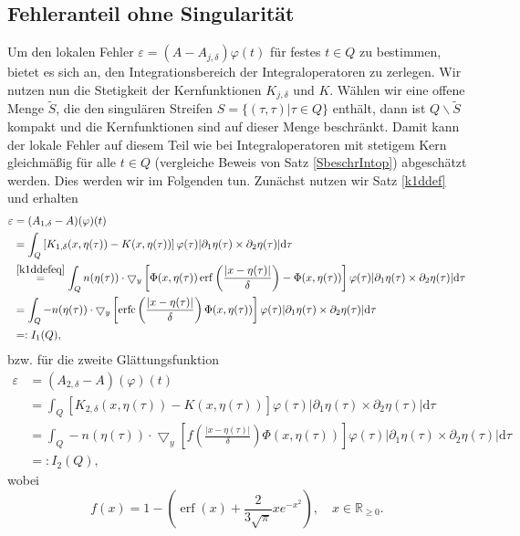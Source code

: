 \documentclass[12pt,a4paper]{scrartcl}
\newcommand{\dd}{\mathrm{d}}
\numberwithin{equation}{section}
\newcommand{\R}{\mathbb{R}} %
\newcommand{\grad}{\bigtriangledown}
\newcommand{\erf}{\operatorname{erf}}
\newcommand{\erfc}{\operatorname{erfc}}
\begin{document}
\subsection{Fehleranteil ohne Singularität} \label{chaepsohnesing}
Um den lokalen Fehler $\varepsilon = (A-A_{j,\delta}) \varphi(t)$ für festes $t \in Q$ zu bestimmen, bietet es sich an, den Integrationsbereich der Integraloperatoren zu zerlegen. Wir nutzen nun die Stetigkeit der Kernfunktionen
$K_{j,\delta}$ und $K$. Wählen wir eine offene Menge $\widetilde S$, die den singulären Streifen $S=\{(\tau,\tau)| \tau \in Q \}$ enthält, dann ist $Q \backslash \widetilde S$ kompakt und die Kernfunktionen sind auf dieser Menge beschränkt.
Damit kann der lokale Fehler auf diesem Teil wie bei Integraloperatoren mit stetigem Kern gleichmäßig für alle $t \in Q$ (vergleiche Beweis von Satz \ref{SbeschrIntop}) abgeschätzt werden.
Dies werden wir im Folgenden tun.
Zunächst nutzen wir Satz \ref{k1ddef} und erhalten
\begin{align*}
\varepsilon &= (A_{1,\delta} - A)(\varphi)(t) \\
&= \int_{Q} \left[K_{1,\delta}(x,\eta(\tau))- K(x,\eta(\tau))\right]\varphi(\tau) |\partial_1 \eta (\tau) \times \partial_2 \eta(\tau)| \dd \tau \\
& \overset{\eqref{k1ddefeq}}{=} \int_{Q} n(\eta(\tau)) \cdot \grad_y \left[ \Phi (x,\eta(\tau)) \erf \left(\frac{|x-\eta(\tau)|}{\delta}\right) - \Phi (x,\eta(\tau)) \right]\varphi(\tau) |\partial_1 \eta (\tau) \times \partial_2 \eta(\tau)| \dd \tau\\
& =\int_{Q} -n(\eta(\tau)) \cdot \grad_y \left[ \erfc \left(\frac{|x-\eta(\tau)|}{\delta}\right)  \Phi (x,\eta(\tau)) \right]\varphi(\tau) |\partial_1 \eta (\tau) \times \partial_2 \eta(\tau)| \dd \tau \\
&=: I_1(Q),
\end{align*}
bzw. für die zweite Glättungsfunktion
\begin{align*}
\varepsilon &= (A_{2,\delta} - A)(\varphi)(t) \\
&= \int_{Q} \left[K_{2,\delta}(x,\eta(\tau))- K(x,\eta(\tau))\right]\varphi(\tau) |\partial_1 \eta (\tau) \times \partial_2 \eta(\tau)| \dd \tau \\
& =\int_{Q} -n(\eta(\tau)) \cdot \grad_y \left[ f \left(\frac{|x-\eta(\tau)|}{\delta}\right)  \Phi (x,\eta(\tau)) \right]\varphi(\tau) |\partial_1 \eta (\tau) \times \partial_2 \eta(\tau)| \dd \tau \\
&=: I_2(Q),
\end{align*}
wobei 
\[
f(x)=
1- \left(\erf(x)+\frac{2}{3\sqrt{\pi}}x e^{-x^2}\right) , \quad x \in \R_{\geq 0}.
\]
\end{document}
